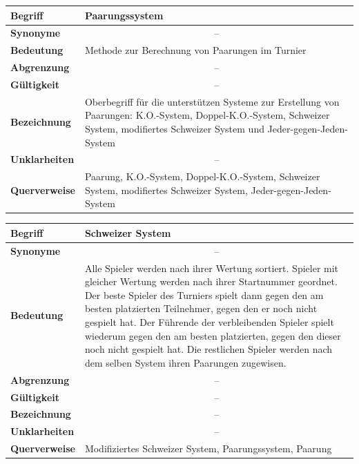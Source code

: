 \documentclass[11pt]{article}
\begin{document}
\begin{tabularx}{\textwidth}{| p{} | p{} |}
	\hline
	\textbf{Begriff} & Paarungssystem\\
	\hline
	\textbf{Synonyme} & \multicolumn{1}{c|}{--} \\
	\hline
	\textbf{Bedeutung} & Methode zur Berechnung von Paarungen im Turnier\\
	\hline
	\textbf{Abgrenzung} & \multicolumn{1}{c|}{--} \\
	\hline
	\textbf{Gültigkeit} & \multicolumn{1}{c|}{--} \\
	\hline
	\textbf{Bezeichnung} & Oberbegriff für die unterstützen Systeme zur Erstellung von Paarungen: K.O.-System, Doppel-K.O.-System, Schweizer System, modifiertes Schweizer System und Jeder-gegen-Jeden-System \\
	\hline 
	\textbf{Unklarheiten} & \multicolumn{1}{c|}{--} \\
	\hline
	\textbf{Querverweise} &  Paarung, K.O.-System, Doppel-K.O.-System, Schweizer System, modifiertes Schweizer System, Jeder-gegen-Jeden-System\\
	\hline
\end{tabularx}

\begin{tabularx}{\textwidth}{| p{} | p{} |}
	\hline
	\textbf{Begriff} & Schweizer System\\ 
	\hline
	\textbf{Synonyme} & \multicolumn{1}{c|}{--}\\
	\hline 
	\textbf{Bedeutung} & Alle Spieler werden nach ihrer Wertung sortiert. Spieler mit gleicher Wertung werden nach ihrer Startnummer geordnet. Der beste Spieler des Turniers spielt dann gegen den am besten platzierten Teilnehmer, gegen den er noch nicht gespielt hat. Der Führende der verbleibenden Spieler spielt wiederum gegen den am besten platzierten, gegen den dieser noch nicht gespielt hat. Die restlichen Spieler werden nach dem selben System ihren Paarungen zugewisen.\\
	\hline
	\textbf{Abgrenzung} & \multicolumn{1}{c|}{--}\\
	\hline
	\textbf{Gültigkeit} & \multicolumn{1}{c|}{--}\\
	\hline
	\textbf{Bezeichnung} & \multicolumn{1}{c|}{--}\\
	\hline
	\textbf{Unklarheiten} & \multicolumn{1}{c|}{--} \\
	\hline
	\textbf{Querverweise} & Modifiziertes Schweizer System, Paarungssystem, Paarung\\
	\hline
\end{tabularx}
\end{document}
